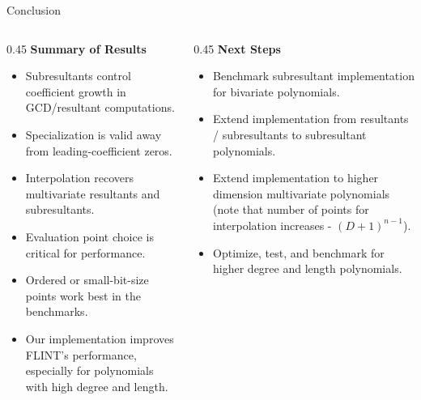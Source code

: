 \documentclass[aspectratio=169]{beamer}
\begin{document}
\begin{frame}{Conclusion}
\footnotesize
\begin{columns}
\begin{column}{0.45\textwidth}
  \textbf{Summary of Results}
  \begin{itemize}
    \item Subresultants control coefficient growth in GCD/resultant computations.
    \item Specialization is valid away from leading-coefficient zeros.
    \item Interpolation recovers multivariate resultants and subresultants.
    \item Evaluation point choice is critical for performance.
    \item Ordered or small-bit-size points work best in the benchmarks.
    \item Our implementation improves FLINT's performance, especially for polynomials with high degree and length.
  \end{itemize}
\end{column}
\pause
\begin{column}{0.45\textwidth}
  \textbf{Next Steps}
  \begin{itemize}
    \item Benchmark subresultant implementation for bivariate polynomials.
    \item Extend implementation from resultants / subresultants to subresultant polynomials.
    \item Extend implementation to higher dimension multivariate polynomials (note that number of points for interpolation increases - $(D + 1)^{n-1}$).
    \item Optimize, test, and benchmark for higher degree and length polynomials.
  \end{itemize}
\end{column}
\end{columns}
\end{frame}
\end{document}
